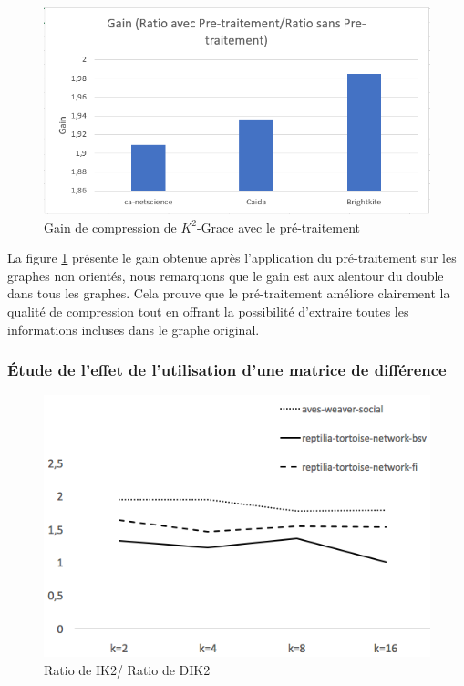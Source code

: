 \begin{figure}[H]
	\centering
	\includegraphics[scale=1]{ressources/image/Tests/gain.png}
	
	\caption{Gain de compression de $K^2$-Grace avec le pré-traitement}
	\label{fig:gain }
\end{figure}

La figure \ref{fig:gain } présente le gain obtenue après l'application du pré-traitement sur les graphes non orientés, nous remarquons que le gain est aux alentour du double dans tous les graphes. Cela prouve que le pré-traitement améliore clairement la qualité de compression tout en offrant la possibilité d'extraire toutes les informations incluses dans le graphe original.

\subsubsection{Étude de l'effet de l'utilisation d'une matrice de différence}



\begin{figure}[H]
	\centering
	\includegraphics[scale=0.5]{ressources/image/perteIk2.png}
	
	\caption{Ratio de IK2/ Ratio de DIK2}
	\label{perte }
\end{figure}

